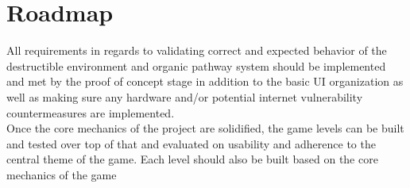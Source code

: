 \documentclass{article}
\begin{document}
\section{Roadmap}

All requirements in regards to validating correct and expected behavior of the destructible environment and organic pathway system should be implemented and met by the proof of concept stage in addition to the basic UI organization as well as making sure any hardware and/or potential internet vulnerability countermeasures are implemented. \\
Once the core mechanics of the project are solidified, the game levels can be built and tested over top of that and evaluated on usability and adherence to the central theme of the game. Each level should also be built based on the core mechanics of the game\\

\newpage{}
\end{document}
